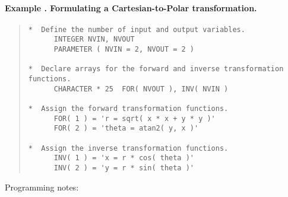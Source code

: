 \documentclass[twoside,11pt]{article}
\newcommand{\numcir}[1]{\mbox{\hspace{3ex}\fbox{#1}}}
\newcounter{examplecounter}
\newcommand{\example}[1]{\addtocounter{examplecounter}{1}
                         \paragraph{\textbf{Example \theexamplecounter. #1}}}
\begin{document}
\example{Formulating a Cartesian-to-Polar transformation.}
\begin{quote}
\begin{tabbing} %

\verb#*  Define the number of input and output variables.    #\\
\verb#      INTEGER NVIN, NVOUT                              #\\
\verb#      PARAMETER ( NVIN = 2, NVOUT = 2 )                #\\
\verb#                                                       #\\
\verb#*  Declare arrays for the forward and inverse transformation functions.#\\
\verb#      CHARACTER * 25  FOR( NVOUT ), INV( NVIN )        #\numcir{1}\\
\verb#                                                       #\\
\verb#*  Assign the forward transformation functions.        #\\
\verb#      FOR( 1 ) = 'r = sqrt( x * x + y * y )'           #\numcir{2}\numcir{3}\\
\verb#      FOR( 2 ) = 'theta = atan2( y, x )'               #\\
\verb#                                                       #\\
\verb#*  Assign the inverse transformation functions.        #\\
\verb#      INV( 1 ) = 'x = r * cos( theta )'                #\\
\verb#      INV( 2 ) = 'y = r * sin( theta )'                #

\end{tabbing}
\end{quote}

Programming notes:
\end{document}
